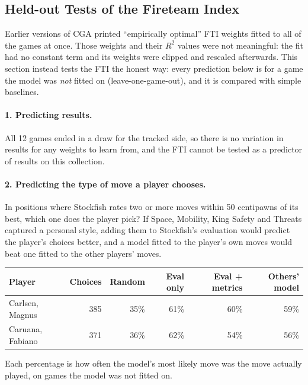 \documentclass[11pt]{book}
\begin{document}
\subsection{Held-out Tests of the Fireteam Index}

Earlier versions of CGA printed ``empirically optimal'' FTI weights fitted to all of the games at once. Those weights and their $R^2$ values were not meaningful: the fit had no constant term and its weights were clipped and rescaled afterwards. This section instead tests the FTI the honest way: every prediction below is for a game the model was \emph{not} fitted on (leave-one-game-out), and it is compared with simple baselines.

\paragraph{1. Predicting results.}
All 12 games ended in a draw for the tracked side, so there is no variation in results for any weights to learn from, and the FTI cannot be tested as a predictor of results on this collection.

\paragraph{2. Predicting the type of move a player chooses.}
In positions where Stockfish rates two or more moves within 50 centipawns of its best, which one does the player pick? If Space, Mobility, King Safety and Threats captured a personal style, adding them to Stockfish's evaluation would predict the player's choices better, and a model fitted to the player's own moves would beat one fitted to the other players' moves.

\begin{center}
\begin{tabular}{lrrrrr}
\toprule
\textbf{Player} & \textbf{Choices} & \textbf{Random} & \textbf{Eval only} & \textbf{Eval + metrics} & \textbf{Others' model} \\
\midrule
Carlsen, Magnus & 385 & 35\% & 61\% & 60\% & 59\% \\
Caruana, Fabiano & 371 & 36\% & 62\% & 54\% & 56\% \\
\bottomrule
\end{tabular}
\end{center}

Each percentage is how often the model's most likely move was the move actually played, on games the model was not fitted on.
\end{document}
